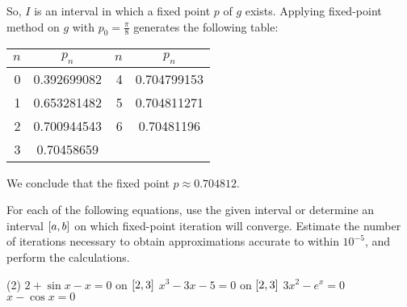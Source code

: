 \documentclass[../../../../Assignments]{subfiles}
\begin{document}
\begin{solution}
\begin{enumerate}[label = \alph*)]
            So, \(I\) is an interval in which a fixed point \(p\) of \(g\)
            exists. Applying fixed-point method on \(g\) with \(p_0 =
            \frac{\pi}{8}\) generates the following table:

            \begin{table}[H]
                \centering
                \begin{tabular}{r S[table-format=1.9] r S[table-format=1.9]}
                    \toprule
                    \(n\)  &   {\(p_n\)}   &  \(n\)  &   {\(p_n\)}   \\
                      &  0.392699082  &      4  &  0.704799153  \\
                        1  &  0.653281482  &      5  &  0.704811271  \\
                        2  &  0.700944543  &      6  &  0.70481196   \\
                        3  &  0.70458659   &         &               \\
                    \bottomrule
                \end{tabular}
            \end{table}

            We conclude that the fixed point \(p \approx \num{0.704812}\).
    \end{enumerate}
\end{solution}

\begin{exercise}
    For each of the following equations, use the given interval or determine an
    interval \(\interval{a}{b}\) on which fixed-point iteration will converge.
    Estimate the number of iterations necessary to obtain approximations
    accurate to within \(10^{-5}\), and perform the calculations.

    \begin{tasks}(2)
        \task \(2 + \sin{x} - x = 0\) on \(\interval{2}{3}\)
        \task \(x^3 - 3x - 5 = 0\) on \(\interval{2}{3}\)
        \task \(3x^2 - e^x = 0\)
        \task \(x - \cos{x} = 0\)
    \end{tasks}
\end{exercise}
\end{document}
